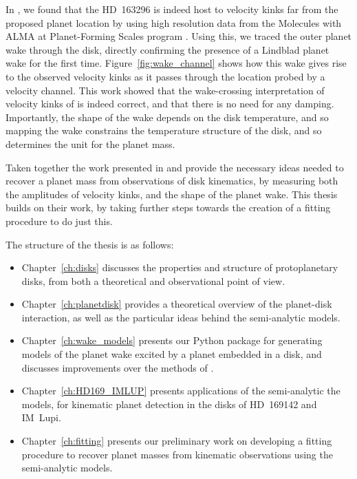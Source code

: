 In \citet{calcino2022}, we found that the HD~163296 is indeed host to velocity kinks far from the proposed planet location by using high resolution data from the Molecules with ALMA at Planet-Forming Scales program \citep[MAPS;][]{oberg2021}.
Using this, we traced the outer planet wake through the disk, directly confirming the presence of a Lindblad planet wake for the first time.
Figure~\ref{fig:wake_channel} shows how this wake gives rise to the observed velocity kinks as it passes through the location probed by a velocity channel.
This work showed that the wake-crossing interpretation of velocity kinks of \citet{bollati2021} is indeed correct, and that there is no need for any damping.
Importantly, the shape of the wake depends on the disk temperature, and so mapping the wake constrains the temperature structure of the disk, and so determines the unit for the planet mass.

Taken together the work presented in \citet{bollati2021} and \citet{calcino2022} provide the necessary ideas needed to recover a planet mass from observations of disk kinematics, by measuring both the amplitudes of velocity kinks, and the shape of the planet wake.
This thesis builds on their work, by taking further steps towards the creation of a fitting procedure to do just this.

The structure of the thesis is as follows:
\begin{itemize}
    \item Chapter~\ref{ch:disks} discusses the properties and structure of protoplanetary disks, from both a theoretical and observational point of view.
    \item Chapter~\ref{ch:planetdisk} provides a theoretical overview of the planet-disk interaction, as well as the particular ideas behind the semi-analytic models.
    \item Chapter~\ref{ch:wake_models} presents our Python package for generating models of the planet wake excited by a planet embedded in a disk, and discusses improvements over the methods of \citet{bollati2021}.
    \item Chapter~\ref{ch:HD169_IMLUP} presents applications of the semi-analytic the models, for kinematic planet detection in the disks of HD~169142 and IM~Lupi.
    \item Chapter~\ref{ch:fitting} presents our preliminary work on developing a fitting procedure to recover planet masses from kinematic observations using the semi-analytic models.
\end{itemize}

